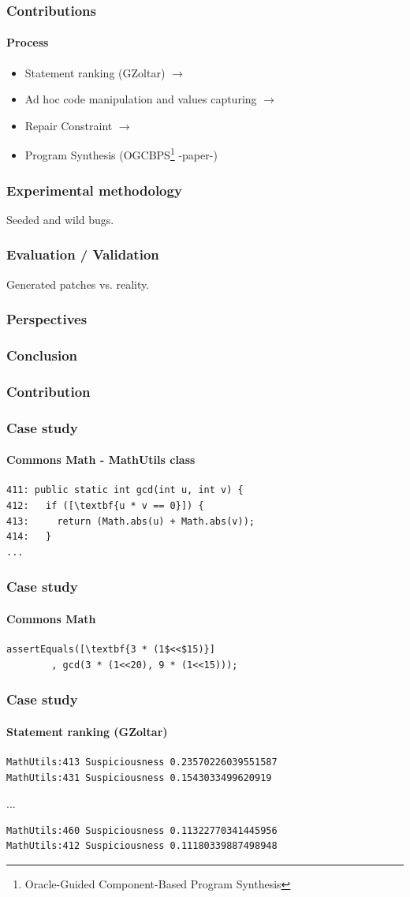 \documentclass{beamer}
\begin{document}
  \frame
  {  
    \frametitle{Contributions}
      \framesubtitle{Process}
\begin{itemize}
\item Statement ranking (GZoltar)  $\rightarrow$
\item Ad hoc code manipulation and values capturing $\rightarrow$
\item Repair Constraint  $\rightarrow$
\item Program Synthesis (OGCBPS\footnote{Oracle-Guided Component-Based Program Synthesis} -paper-)
\end{itemize}
}


  \frame
  {
    \frametitle{Experimental methodology}
    Seeded and wild bugs.
  }
  
  \frame
  {
    \frametitle{Evaluation / Validation}
    Generated patches vs. reality.
  }
  
  \frame
  {
    \frametitle{Perspectives}
    
  }
  
  \frame
  {
    \frametitle{Conclusion}
    
  }

  \frame
  {
    \frametitle{Contribution}
    
  }
  
 \begin{frame}[fragile]
    \frametitle{Case study}
      \framesubtitle{Commons Math - MathUtils class}
\begin{lstlisting}[escapeinside=\[\]]
411: public static int gcd(int u, int v) {
412:   if ([\textbf{u * v == 0}]) {
413:     return (Math.abs(u) + Math.abs(v));
414:   }
...
\end{lstlisting}
\end{frame}

 \begin{frame}[fragile]
    \frametitle{Case study}
      \framesubtitle{Commons Math}
        \begin{lstlisting}[escapeinside=\[\]]
assertEquals([\textbf{3 * (1$<<$15)}]
        , gcd(3 * (1<<20), 9 * (1<<15)));
	\end{lstlisting}
\end{frame}

 \begin{frame}[fragile]
    \frametitle{Case study}
      \framesubtitle{Statement ranking (GZoltar)}
\begin{verbatim}
MathUtils:413 Suspiciousness 0.23570226039551587
MathUtils:431 Suspiciousness 0.1543033499620919
\end{verbatim}
...
\begin{verbatim}
MathUtils:460 Suspiciousness 0.11322770341445956
MathUtils:412 Suspiciousness 0.11180339887498948
\end{verbatim}
\end{frame}
\end{document}
